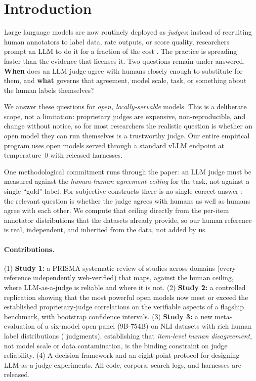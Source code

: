 \section{Introduction}
Large language models are now routinely deployed as \emph{judges}: instead of recruiting human annotators to label
data, rate outputs, or score quality, researchers prompt an LLM to do it for a fraction of the cost
\citep{zheng2023mtbench,liu2023geval,gilardi2023chatgpt}. The practice is spreading faster than the evidence that
licenses it. Two questions remain under-answered. \textbf{When} does an LLM judge agree with humans closely enough to
substitute for them, and \textbf{what} governs that agreement, model scale, task, or something about the human
labels themselves?

We answer these questions for \emph{open, locally-servable} models. This is a deliberate scope, not a limitation:
proprietary judges are expensive, non-reproducible, and change without notice, so for most researchers the realistic
question is whether an open model they can run themselves is a trustworthy judge. Our entire empirical program uses
open models served through a standard vLLM endpoint at temperature~0 with released harnesses.

One methodological commitment runs through the paper: an LLM judge must be measured against the \emph{human-human
agreement ceiling} for the task, not against a single ``gold'' label. For subjective constructs there is no single
correct answer \citep{aroyo2015truth,plank2022humanlabel}; the relevant question is whether the judge agrees with
humans as well as humans agree with each other. We compute that ceiling directly from the per-item annotator
distributions that the datasets already provide, so our human reference is real, independent, and inherited from the
data, not added by us.

\paragraph{Contributions.} (1) \textbf{Study 1:} a PRISMA systematic review of \Nstudies{} studies across
\Ndomains{} domains (every reference independently web-verified) that maps, against the human ceiling, where
LLM-as-a-judge is reliable and where it is not. (2) \textbf{Study 2:} a controlled replication showing that the most
powerful open models now meet or exceed the established proprietary-judge correlations on the verifiable aspects of a
flagship benchmark, with bootstrap confidence intervals. (3) \textbf{Study 3:} a new meta-evaluation of a six-model
open panel (9B-754B) on NLI datasets with rich human label distributions (\NLInjudg{} judgments), establishing that
\emph{item-level human disagreement}, not model scale or data contamination, is the binding constraint on judge
reliability. (4) A decision framework and an eight-point protocol for designing LLM-as-a-judge experiments. All
code, corpora, search logs, and harnesses are released.
